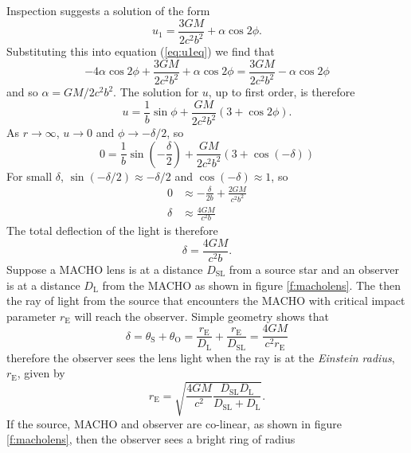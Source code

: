 Inspection suggests a solution of the form
\begin{equation}
u_1 = \frac{3GM}{2c^2b^2} + \alpha \cos 2\phi.
\end{equation}
Substituting this into equation (\ref{eq:u1eq}) we find that
\begin{equation}
-4\alpha \cos 2\phi + \frac{3GM}{2c^2b^2} + \alpha\cos 2\phi =
\frac{3GM}{2c^2b^2} - \alpha\cos 2\phi
\end{equation}
and so $\alpha = GM/2c^2b^2$. The solution for $u$, up to first order, is
therefore
\begin{equation}
u = \frac{1}{b} \sin \phi + \frac{GM}{2c^2b^2}\left(3 + \cos 2\phi\right).
\end{equation}
As $r \rightarrow \infty$, $u \rightarrow 0$ and $\phi \rightarrow - \delta/2$,
so
\begin{equation}
0 = \frac{1}{b} \sin \left(-\frac{\delta}{2}\right) + 
\frac{GM}{2c^2b^2} \left(3 + \cos(-\delta)\right)
\end{equation}
For small $\delta$, $\sin(-\delta/2) \approx -\delta/2$ and $\cos(-\delta)
\approx 1$, so
\begin{align}
0 &\approx - \frac{\delta}{2b} + \frac{2GM}{c^2b^2} \\
\delta &\approx \frac{4GM}{c^2b}
\end{align}
The total deflection of the light is therefore
\begin{equation}
\delta = \frac{4GM}{c^2 b}.
\end{equation}
Suppose a MACHO lens is at a distance $D_\mathrm{SL}$ from a source star and
an observer is at a distance $D_\mathrm{L}$ from the MACHO as shown in figure
\ref{f:macholens}. The then the ray of light from the source that encounters
the MACHO with critical impact parameter $r_\mathrm{E}$ will reach the
observer. Simple geometry shows that
\begin{equation}
\delta = \theta_\mathrm{S} + \theta_\mathrm{O} =
\frac{r_\mathrm{E}}{D_\mathrm{L}} + \frac{r_\mathrm{E}}{D_\mathrm{SL}} =
\frac{4GM}{c^2r_\mathrm{E}}
\end{equation}
therefore the observer sees the lens light when the ray is at the
\emph{Einstein radius}, $r_\mathrm{E}$, given by
\begin{equation}
r_\mathrm{E} = \sqrt{\frac{4GM}{c^2} \frac{D_\mathrm{SL} D_\mathrm{L}}
{D_\mathrm{SL} + D_\mathrm{L}}}.
\end{equation}
If the source, MACHO and observer are co-linear, as shown in figure
\ref{f:macholens}, then the observer sees a bright ring of radius
